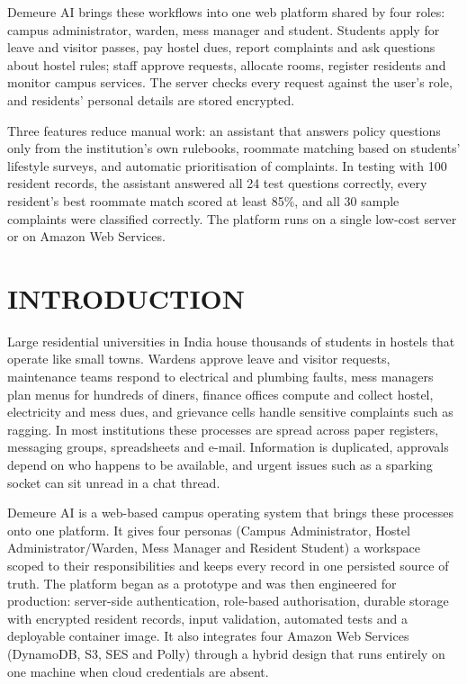 \documentclass[12pt,a4paper,oneside]{report}
\begin{document}
Demeure AI brings these workflows into one web platform shared by four roles: campus administrator, warden, mess
manager and student. Students apply for leave and visitor passes, pay hostel dues, report complaints and ask questions
about hostel rules; staff approve requests, allocate rooms, register residents and monitor campus services. The server
checks every request against the user's role, and residents' personal details are stored encrypted.

Three features reduce manual work: an assistant that answers policy questions only from the institution's own
rulebooks, roommate matching based on students' lifestyle surveys, and automatic prioritisation of complaints. In
testing with 100 resident records, the assistant answered all 24 test questions correctly, every resident's best
roommate match scored at least 85\%, and all 30 sample complaints were classified correctly. The platform runs on a
single low-cost server or on Amazon Web Services.
\onehalfspacing

\clearpage
{\setlength{\parskip}{0pt}\tableofcontents}

\clearpage
{}

\chapter{INTRODUCTION}
Large residential universities in India house thousands of students in hostels that operate like small towns. Wardens
approve leave and visitor requests, maintenance teams respond to electrical and plumbing faults, mess managers plan
menus for hundreds of diners, finance offices compute and collect hostel, electricity and mess dues, and grievance
cells handle sensitive complaints such as ragging. In most institutions these processes are spread across paper
registers, messaging groups, spreadsheets and e-mail. Information is duplicated, approvals depend on who happens to be
available, and urgent issues such as a sparking socket can sit unread in a chat thread.

Demeure AI is a web-based campus operating system that brings these processes onto one platform. It gives four
personas (Campus Administrator, Hostel Administrator/Warden, Mess Manager and Resident Student) a workspace scoped to
their responsibilities and keeps every record in one persisted source of truth. The platform began as a prototype and
was then engineered for production: server-side authentication, role-based authorisation, durable storage with encrypted resident records, input
validation, automated tests and a deployable container image. It also integrates
four Amazon Web Services (DynamoDB, S3, SES and Polly) through a hybrid design that runs entirely on one machine when
cloud credentials are absent.
\end{document}
